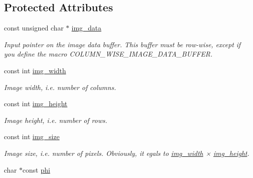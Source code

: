 \subsection*{Protected Attributes}
\begin{DoxyCompactItemize}
\item 
\hypertarget{classofeli_1_1_active_contour_a96480d79e9a60817925903da233a5b1e}{const unsigned char $\ast$ \hyperlink{classofeli_1_1_active_contour_a96480d79e9a60817925903da233a5b1e}{img\-\_\-data}}\label{classofeli_1_1_active_contour_a96480d79e9a60817925903da233a5b1e}

\begin{DoxyCompactList}\small\item\em Input pointer on the image data buffer. This buffer must be row-\/wise, except if you define the macro C\-O\-L\-U\-M\-N\-\_\-\-W\-I\-S\-E\-\_\-\-I\-M\-A\-G\-E\-\_\-\-D\-A\-T\-A\-\_\-\-B\-U\-F\-F\-E\-R. \end{DoxyCompactList}\item 
\hypertarget{classofeli_1_1_active_contour_a3623de7ebc0d27ba7fac21a5929afbc6}{const int \hyperlink{classofeli_1_1_active_contour_a3623de7ebc0d27ba7fac21a5929afbc6}{img\-\_\-width}}\label{classofeli_1_1_active_contour_a3623de7ebc0d27ba7fac21a5929afbc6}

\begin{DoxyCompactList}\small\item\em Image width, i.\-e. number of columns. \end{DoxyCompactList}\item 
\hypertarget{classofeli_1_1_active_contour_a88d02b47bab737ec97fe3a7ea9554c0c}{const int \hyperlink{classofeli_1_1_active_contour_a88d02b47bab737ec97fe3a7ea9554c0c}{img\-\_\-height}}\label{classofeli_1_1_active_contour_a88d02b47bab737ec97fe3a7ea9554c0c}

\begin{DoxyCompactList}\small\item\em Image height, i.\-e. number of rows. \end{DoxyCompactList}\item 
\hypertarget{classofeli_1_1_active_contour_a9182e11132f64d7607fbd19a78f58387}{const int \hyperlink{classofeli_1_1_active_contour_a9182e11132f64d7607fbd19a78f58387}{img\-\_\-size}}\label{classofeli_1_1_active_contour_a9182e11132f64d7607fbd19a78f58387}

\begin{DoxyCompactList}\small\item\em Image size, i.\-e. number of pixels. Obviously, it egals to \hyperlink{classofeli_1_1_active_contour_a3623de7ebc0d27ba7fac21a5929afbc6}{img\-\_\-width} × \hyperlink{classofeli_1_1_active_contour_a88d02b47bab737ec97fe3a7ea9554c0c}{img\-\_\-height}. \end{DoxyCompactList}\item 
\hypertarget{classofeli_1_1_active_contour_aacb03a6ded4ca51cb52f58aeff955ef7}{char $\ast$const \hyperlink{classofeli_1_1_active_contour_aacb03a6ded4ca51cb52f58aeff955ef7}{phi}}\label{classofeli_1_1_active_contour_aacb03a6ded4ca51cb52f58aeff955ef7}


\end{DoxyCompactItemize}
